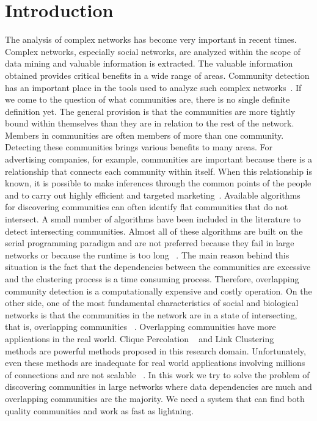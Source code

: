 \section{Introduction}\label{sec:introduction}
The analysis of complex networks has become very important in recent times. Complex networks, especially social networks, are analyzed within the scope of data mining and valuable information is extracted. The valuable information obtained provides critical benefits in a wide range of areas. Community detection has an important place in the tools used to analyze such complex networks~\cite{ref:Fort}. If we come to the question of what communities are, there is no single definite definition yet. The general provision is that the communities are more tightly bound within themselves than they are in relation to the rest of the network. Members in communities are often members of more than one community. Detecting these communities brings various benefits to many areas. For advertising companies, for example, communities are important because there is a relationship that connects each community within itself. When this relationship is known, it is possible to make inferences through the common points of the people and to carry out highly efficient and targeted marketing~\cite{ref:Lancichinetti}. Available algorithms for discovering communities can often identify flat communities that do not intersect. A small number of algorithms have been included in the literature to detect intersecting communities. Almost all of these algorithms are built on the serial programming paradigm and are not preferred because they fail in large networks or because the runtime is too long ~\cite{ref:PhysRevE}. The main reason behind this situation is the fact that the dependencies between the communities are excessive and the clustering process is a time consuming process. Therefore, overlapping community detection is a computationally expensive and costly operation. On the other side, one of the most fundamental characteristics of social and biological networks is that the communities in the network are in a state of intersecting, that is, overlapping communities  ~\cite{ref:Gold}. Overlapping communities have more applications in the real world. Clique Percolation ~\cite{ref:Palla} and Link Clustering ~\cite{ref:LinkCls} methods are powerful methods proposed in this research domain. Unfortunately, even these methods are inadequate for real world applications involving millions of connections and are not scalable ~\cite{ref:Matrix}. 
In this work we try to solve the problem of discovering communities in large networks where data dependencies are much and overlapping communities are the majority. We need a system that can find both quality communities and work as fast as lightning.
